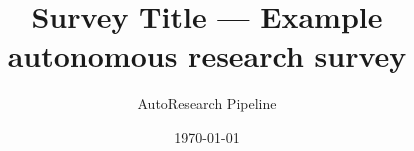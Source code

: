 \documentclass[11pt]{article}
\title{Survey Title — Example autonomous research survey}
\author{AutoResearch Pipeline}
\date{\today}
\begin{document}
\maketitle

\begin{abstract}
\end{abstract}







\end{document}
